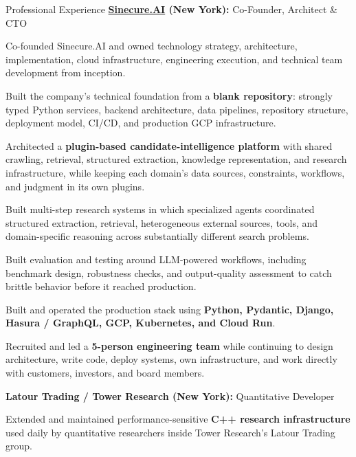 \begin{rubric}{Professional Experience}
  \entry*[2021--2024]%
  \textbf{\href{https://sinecure.ai}{Sinecure.AI} (New York):} Co-Founder, Architect \& CTO
  \par
  \begin{cvitems}
    \item Co-founded Sinecure.AI and owned technology strategy, architecture, implementation, cloud
    infrastructure, engineering execution, and technical team development from inception.
    \item Built the company's technical foundation from a \textbf{blank repository}: strongly typed Python
    services, backend architecture, data pipelines, repository structure, deployment model, CI/CD, and
    production GCP infrastructure.
    \item Architected a \textbf{plugin-based candidate-intelligence platform} with shared crawling,
    retrieval, structured extraction, knowledge representation, and research infrastructure, while keeping
    each domain's data sources, constraints, workflows, and judgment in its own plugins.
    \item Built multi-step research systems in which specialized agents coordinated structured extraction,
    retrieval, heterogeneous external sources, tools, and domain-specific reasoning across substantially
    different search problems.
    \item Built evaluation and testing around LLM-powered workflows, including benchmark design, robustness
    checks, and output-quality assessment to catch brittle behavior before it reached production.
    \item Built and operated the production stack using \textbf{Python, Pydantic, Django, Hasura / GraphQL,
    GCP, Kubernetes, and Cloud Run}.
    \item Recruited and led a \textbf{5-person engineering team} while continuing to design architecture,
    write code, deploy systems, own infrastructure, and work directly with customers, investors, and board
    members.
  \end{cvitems}


  \entry*[2024--2025]%
  \textbf{Latour Trading / Tower Research (New York):} Quantitative Developer
  \par
  Extended and maintained performance-sensitive \textbf{C++ research infrastructure} used daily by
  quantitative researchers inside Tower Research's Latour Trading group.


\end{rubric}
